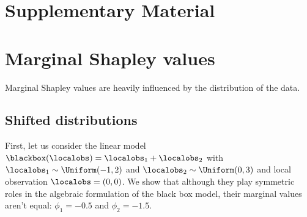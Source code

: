 

\section*{Supplementary Material}

\section{Marginal Shapley values} 

Marginal Shapley values are heavily influenced by the distribution of the data.

\subsection{Shifted distributions}
\label{sec:suppl_marg_mean}

First, let us consider the linear model $\blackbox(\localobs)=\localobs_1+\localobs_2$ with $\localobs_1\sim\Uniform(-1, 2)$ and $\localobs_2\sim\Uniform(0, 3)$ and local observation $\localobs=(0, 0)$. We show that although they play symmetric roles in the algebraic formulation of the black box model, their marginal values aren't equal: $\phi_{1}=-0.5$ and $\phi_{2}=-1.5$. 

